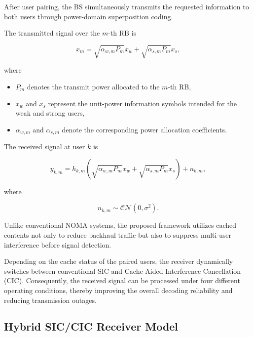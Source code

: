 \documentclass[conference]{IEEEtran}
\begin{document}
After user pairing, the BS simultaneously transmits the requested information to both users through power-domain superposition coding.

The transmitted signal over the $m$-th RB is

\begin{equation}
x_m
=
\sqrt{\alpha_{w,m}P_m}x_w
+
\sqrt{\alpha_{s,m}P_m}x_s,
\label{eq:superposition}
\end{equation}

where

\begin{itemize}
\item $P_m$ denotes the transmit power allocated to the $m$-th RB,
\item $x_w$ and $x_s$ represent the unit-power information symbols intended for the weak and strong users,
\item $\alpha_{w,m}$ and $\alpha_{s,m}$ denote the corresponding power allocation coefficients.
\end{itemize}

The received signal at user $k$ is

\begin{equation}
y_{k,m}
=
h_{k,m}
\left(
\sqrt{\alpha_{w,m}P_m}x_w
+
\sqrt{\alpha_{s,m}P_m}x_s
\right)
+n_{k,m},
\end{equation}

where

\begin{equation}
n_{k,m}\sim\mathcal{CN}(0,\sigma^2).
\end{equation}

Unlike conventional NOMA systems, the proposed framework utilizes cached contents not only to reduce backhaul traffic but also to suppress multi-user interference before signal detection.

Depending on the cache status of the paired users, the receiver dynamically switches between conventional SIC and Cache-Aided Interference Cancellation (CIC). Consequently, the received signal can be processed under four different operating conditions, thereby improving the overall decoding reliability and reducing transmission outages.

\subsection{Hybrid SIC/CIC Receiver Model}
\end{document}
